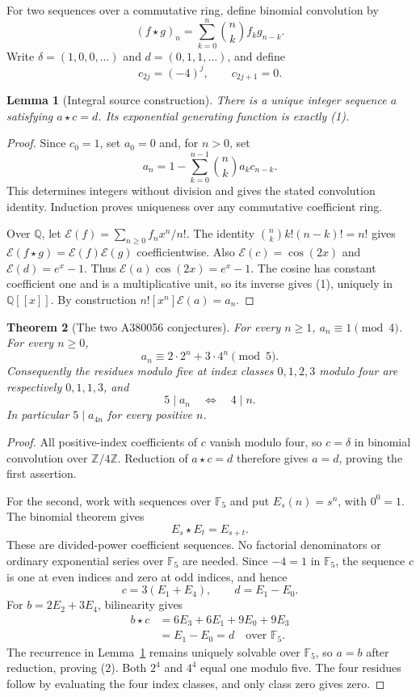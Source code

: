 \documentclass[11pt,a4paper]{article}
\newtheorem{theorem}{Theorem}[section]
\newtheorem{lemma}[theorem]{Lemma}
\theoremstyle{remark}
\newcommand{\Z}{\mathbb Z}
\newcommand{\Q}{\mathbb Q}
\newcommand{\F}{\mathbb F}
\newcommand{\E}{\mathcal E}
\begin{document}
For two sequences over a commutative ring, define binomial convolution by
\[
 (f\star g)_n=\sum_{k=0}^n\binom nk f_k g_{n-k}.
\]
Write $\delta=(1,0,0,\ldots)$ and $d=(0,1,1,\ldots)$, and define
\[
 c_{2j}=(-4)^j,\qquad c_{2j+1}=0.
\]

\begin{lemma}[Integral source construction]\label{lem:egfsource}
There is a unique integer sequence $a$ satisfying $a\star c=d$. Its
exponential generating function is exactly (1).
\end{lemma}

\begin{proof}
Since $c_0=1$, set $a_0=0$ and, for $n>0$, set
\[
 a_n=1-\sum_{k=0}^{n-1}\binom nk a_k c_{n-k}.
\]
This determines integers without division and gives the stated
convolution identity. Induction proves uniqueness over any commutative
coefficient ring.

Over $\Q$, let $\E(f)=\sum_{n\ge0}f_nx^n/n!$. The identity
$\binom nk k!(n-k)!=n!$ gives
$\E(f\star g)=\E(f)\E(g)$ coefficientwise. Also
$\E(c)=\cos(2x)$ and $\E(d)=e^x-1$. Thus
$\E(a)\cos(2x)=e^x-1$. The cosine has constant coefficient one and is
a multiplicative unit, so its inverse gives (1), uniquely in $\Q[[x]]$.
By construction $n![x^n]\E(a)=a_n$.
\end{proof}

\begin{theorem}[The two A380056 conjectures]\label{thm:egf}
For every $n\ge1$, $a_n\equiv1\pmod4$. For every $n\ge0$,
\[
 a_n\equiv2\cdot2^n+3\cdot4^n\pmod5. \tag{2}
\]
Consequently the residues modulo five at index classes $0,1,2,3$ modulo
four are respectively $0,1,1,3$, and
\[
 5\mid a_n\quad\Longleftrightarrow\quad4\mid n.
\]
In particular $5\mid a_{4n}$ for every positive $n$.
\end{theorem}

\begin{proof}
All positive-index coefficients of $c$ vanish modulo four, so $c=\delta$
in binomial convolution over $\Z/4\Z$. Reduction of $a\star c=d$
therefore gives $a=d$, proving the first assertion.

For the second, work with sequences over $\F_5$ and put $E_s(n)=s^n$,
with $0^0=1$. The binomial theorem gives
\[
 E_s\star E_t=E_{s+t}.
\]
These are divided-power coefficient sequences. No factorial denominators
or ordinary exponential series over $\F_5$ are needed. Since $-4=1$ in
$\F_5$, the sequence $c$ is one at even indices and zero at odd indices,
and hence
\[
 c=3(E_1+E_4),\qquad d=E_1-E_0.
\]
For $b=2E_2+3E_4$, bilinearity gives
\[
 \begin{aligned}
 b\star c
 &=6E_3+6E_1+9E_0+9E_3\\
 &=E_1-E_0=d
 \quad\text{over }\F_5.
 \end{aligned}
\]
The recurrence in Lemma~\ref{lem:egfsource} remains uniquely solvable
over $\F_5$, so $a=b$ after reduction, proving (2). Both $2^4$ and $4^4$
equal one modulo five. The four residues follow by evaluating the four
index classes, and only class zero gives zero.
\end{proof}
\end{document}
